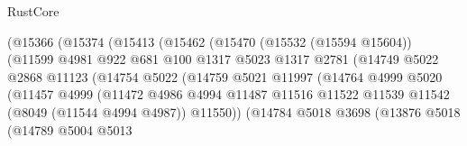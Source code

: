 \begin{lexlean}{RustCore}
\begin{coremodule}
                                (@15366
                                  (@15374
                                    (@15413
                                      (@15462
                                        (@15470
                                          (@15532 (@15594 @15604))
                                          (@11599
                                            @4981
                                            @922
                                            @681
                                            @100
                                            @1317
                                            @5023
                                            @1317
                                            @2781
                                            (@14749
                                              @5022
                                              @2868
                                              @11123
                                              (@14754
                                                @5022
                                                (@14759
                                                  @5021
                                                  @11997
                                                  (@14764
                                                    @4999
                                                    @5020
                                                    (@11457
                                                      @4999
                                                      (@11472
                                                        @4986
                                                        @4994
                                                        @11487
                                                        @11516
                                                        @11522
                                                        @11539
                                                        @11542
                                                        (@8049 (@11544 @4994 @4987))
                                                        @11550))
                                                    (@14784
                                                      @5018
                                                      @3698
                                                      (@13876
                                                        @5018
                                                        (@14789
                                                          @5004
                                                          @5013

\end{coremodule}
\end{lexlean}

